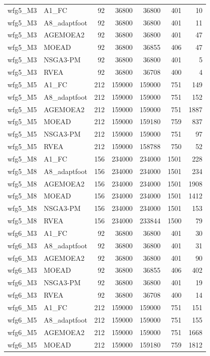 \begin{tabular}{llrrrrr}
wfg5_M3 & A1_FC & 92 & 36800 & 36800 & 401 & 10 \\
wfg5_M3 & A8_adaptfoot & 92 & 36800 & 36800 & 401 & 11 \\
wfg5_M3 & AGEMOEA2 & 92 & 36800 & 36800 & 401 & 47 \\
wfg5_M3 & MOEAD & 92 & 36800 & 36855 & 406 & 47 \\
wfg5_M3 & NSGA3-PM & 92 & 36800 & 36800 & 401 & 5 \\
wfg5_M3 & RVEA & 92 & 36800 & 36708 & 400 & 4 \\
wfg5_M5 & A1_FC & 212 & 159000 & 159000 & 751 & 149 \\
wfg5_M5 & A8_adaptfoot & 212 & 159000 & 159000 & 751 & 152 \\
wfg5_M5 & AGEMOEA2 & 212 & 159000 & 159000 & 751 & 1887 \\
wfg5_M5 & MOEAD & 212 & 159000 & 159180 & 759 & 837 \\
wfg5_M5 & NSGA3-PM & 212 & 159000 & 159000 & 751 & 97 \\
wfg5_M5 & RVEA & 212 & 159000 & 158788 & 750 & 52 \\
wfg5_M8 & A1_FC & 156 & 234000 & 234000 & 1501 & 228 \\
wfg5_M8 & A8_adaptfoot & 156 & 234000 & 234000 & 1501 & 234 \\
wfg5_M8 & AGEMOEA2 & 156 & 234000 & 234000 & 1501 & 1908 \\
wfg5_M8 & MOEAD & 156 & 234000 & 234000 & 1501 & 1412 \\
wfg5_M8 & NSGA3-PM & 156 & 234000 & 234000 & 1501 & 153 \\
wfg5_M8 & RVEA & 156 & 234000 & 233844 & 1500 & 79 \\
wfg6_M3 & A1_FC & 92 & 36800 & 36800 & 401 & 30 \\
wfg6_M3 & A8_adaptfoot & 92 & 36800 & 36800 & 401 & 31 \\
wfg6_M3 & AGEMOEA2 & 92 & 36800 & 36800 & 401 & 90 \\
wfg6_M3 & MOEAD & 92 & 36800 & 36855 & 406 & 402 \\
wfg6_M3 & NSGA3-PM & 92 & 36800 & 36800 & 401 & 19 \\
wfg6_M3 & RVEA & 92 & 36800 & 36708 & 400 & 14 \\
wfg6_M5 & A1_FC & 212 & 159000 & 159000 & 751 & 151 \\
wfg6_M5 & A8_adaptfoot & 212 & 159000 & 159000 & 751 & 155 \\
wfg6_M5 & AGEMOEA2 & 212 & 159000 & 159000 & 751 & 1668 \\
wfg6_M5 & MOEAD & 212 & 159000 & 159180 & 759 & 1812 \\

\end{tabular}
